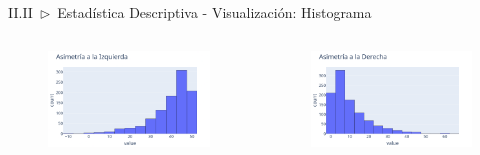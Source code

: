 \documentclass[xcolor=dvipsnames]{beamer}
\begin{document}
    \begin{frame}{II.II~$\rhd$~Estadística Descriptiva - Visualización: Histograma}
        \begin{columns}
            \begin{figure}
                \centering
                \includegraphics[width=\textwidth]{imgs/plots/histplot_03.png}
            \end{figure}
            \begin{figure}
                \centering
                \includegraphics[width=\textwidth]{imgs/plots/histplot_04.png}
            \end{figure}
        \end{columns}
        \begin{columns}
            \begin{figure}
                \centering

\end{figure}
\end{columns}
\end{frame}
\end{document}
